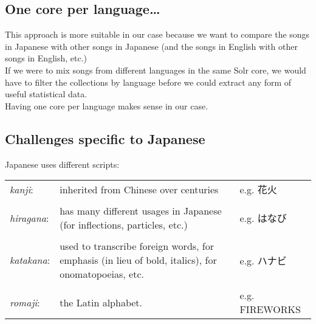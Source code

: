 \subsection{One core per language\dots}

This approach is more suitable in our case because we want to compare the songs in Japanese with other songs in Japanese (and the songs in English with other songs in English, etc.) \\

If we were to mix songs from different languages in the same Solr core, we would have to filter the collections by language before we could extract any form of useful statistical data. \\

Having one core per language makes sense in our case. \\





\newpage

\subsection{Challenges specific to Japanese}

Japanese uses different scripts:

\begin{center}
	\begin{tabular}{l p{7cm} l}
		\emph{kanji}: & inherited from Chinese over centuries 
		&  e.g. 花火 \\
		
		& & \\
		
		\emph{hiragana}: & has many different usages in Japanese (for inflections, particles, etc.) 
		&  e.g. はなび \\
		
		& & \\
		
		\emph{katakana}: & used to transcribe foreign words, for emphasis (in lieu of bold, italics), for onomatopoeias, etc.  
		&  e.g. ハナビ \\
		& & \\
		
		\emph{romaji}: & the Latin alphabet. 
		&  e.g. FIREWORKS \\
		
	\end{tabular}
\end{center}

